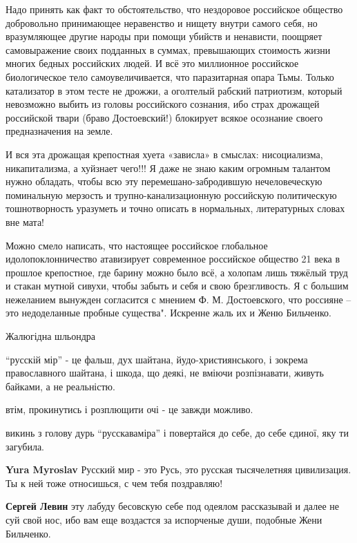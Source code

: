 \begin{itemize}
Надо принять как факт то обстоятельство, что нездоровое российское общество
добровольно принимающее неравенство и нищету внутри самого себя, но
вразумляющее другие народы при помощи убийств и ненависти, поощряет
самовыражение своих подданных в суммах, превышающих стоимость жизни многих
бедных российских людей. И всё это миллионное российское биологическое тело
самоувеличивается, что паразитарная опара Тьмы. Только катализатор в этом тесте
не дрожжи, а оголтелый рабский патриотизм, который невозможно выбить из головы
российского сознания, ибо страх дрожащей российской твари (браво Достоевский!)
блокирует всякое осознание своего предназначения на земле.

И вся эта дрожащая крепостная хуета «зависла» в смыслах: нисоциализма,
никапитализма, а хуйзнает чего!!! Я даже не знаю каким огромным талантом нужно
обладать, чтобы всю эту перемешано-забродившую нечеловеческую поминальную
мерзость и трупно-канализационную российскую политическую тошнотворность
уразуметь и точно описать в нормальных, литературных словах вне мата!

Можно смело написать, что настоящее российское глобальное идолопоклонничество
атавизирует современное российское общество 21 века в прошлое крепостное, где
барину можно было всё, а холопам лишь тяжёлый труд и стакан мутной сивухи,
чтобы забыть и себя и свою брезгливость. Я с большим нежеланием вынужден
согласится с мнением Ф. М. Достоевского, что россияне – это недоделанные
пробные существа". Искренне жаль их и Женю Бильченко.


Жалюгідна шльондра


\enquote{русскій мір} - це фальш, дух шайтана, йудо-християнського, і зокрема
православного шайтана, і шкода, що деякі, не вміючи розпізнавати, живуть
байками, а не реальністю.

втім, прокинутись і розплющити очі - це завжди можливо.

викинь з голову дурь \enquote{русскаваміра} і повертайся до себе, до себе єдиної, яку
ти загубила.

\begin{itemize} %
\textbf{Yura Myroslav} Русский мир - это Русь, это русская тысячелетняя цивилизация. Ты к ней тоже относишься, с чем тебя поздравляю!

\textbf{Сергей Левин} эту лабуду бесовскую себе под одеялом рассказывай и далее не суй свой нос, ибо вам еще воздастся за испорченые души, подобные Жени Бильченко.


\end{itemize}
\end{itemize}
